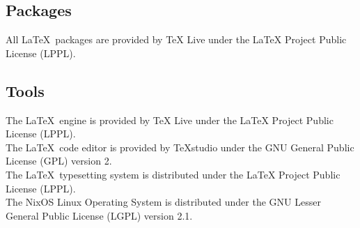 \documentclass[a4paper,12pt]{article}
\begin{document}
	\subsection{Packages}
	All \LaTeX\, packages are provided by TeX Live under the LaTeX Project Public License (LPPL).\\
	
	\subsection{Tools}
	The \LaTeX\, engine is provided by TeX Live under the LaTeX Project Public License (LPPL).\\
	
	The \LaTeX\, code editor is provided by TeXstudio under the GNU General Public License (GPL) version 2.\\
	
	The \LaTeX\, typesetting system is distributed under the LaTeX Project Public License (LPPL).\\
	
	The NixOS Linux Operating System is distributed under the GNU Lesser General Public License (LGPL) version 2.1.\\
	
	
\end{document}
